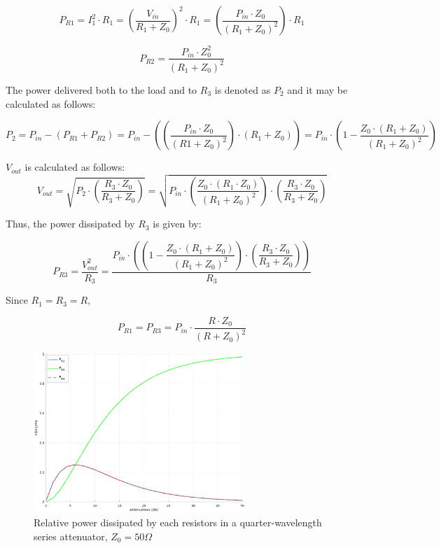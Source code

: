 \begin{equation}
P_{R1} = I_1^2 \cdot R_1 = \left( \dfrac{V_{in}}{R_1 + Z_0} \right)^2 \cdot R_1 = \left( \dfrac{P_{in} \cdot Z_0}{(R_1 + Z_0)^2} \right) \cdot R_1
\end{equation}


\begin{equation}
P_{R2} = \dfrac{P_{in} \cdot Z_0^2}{(R_1 + Z_0)^2}
\end{equation}

\noindent The power delivered both to the load and to $R_3$ is denoted as $P_2$ and it may be calculated as follows:

\begin{equation}
P_2 = P_{in} - (P_{R1} + P_{R2}) = P_{in} - \left( \left( \dfrac{P_{in} \cdot Z_0}{(R1 + Z_0)^2} \right) \cdot \left( R_1 + Z_0\right) \right) = P_{in} \cdot \left( 1 - \dfrac{Z_0 \cdot (R_1 + Z_0)}{(R_1 + Z_0)^2} \right)
\end{equation}


\noindent $V_{out}$ is calculated as follows:
\begin{equation}
V_{out} = \sqrt{P_2 \cdot \left( \dfrac{R_3 \cdot Z_0}{R_3 + Z_0} \right)} = \sqrt{ P_{in} \cdot \left( \dfrac{Z_0 \cdot (R_1 \cdot Z_0)}{(R_1 + Z_0)^2} \right) \cdot \left( \dfrac{R_3 \cdot Z_0}{R_3 + Z_0}\right)}
\end{equation}

\noindent Thus, the power dissipated by $R_3$ is given by:

\begin{equation}
P_{R3} = \dfrac{V_{out}^2}{R_3} = \dfrac{P_{in} \cdot \left( \left( 1 - \dfrac{Z_0 \cdot (R_1 + Z_0)}{(R_1 + Z_0)^2}\right) \cdot \left( \dfrac{R_3 \cdot Z_0}{R_3 + Z_0}\right) \right)}{R_3}
\end{equation}

\noindent Since $R_1 = R_3 = R$,

\begin{equation}
P_{R1} = P_{R3} = P_{in} \cdot \dfrac{R \cdot Z_0}{(R + Z_0)^2}
\end{equation}


\begin{figure}[ht]
\begin{center}
\includegraphics[width=8cm]{Relative-dissipated-QW_series_Z0_50}
\end{center}
\caption{Relative power dissipated by each resistors in a quarter-wavelength series attenuator, $Z_{0} = 50\Omega$}
\label{fig:qw-series-attenuator-pow-diss}
\end{figure}
\FloatBarrier

